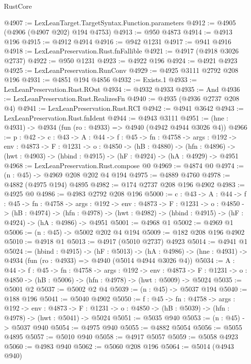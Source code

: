 \begin{lexlean}{RustCore}
\begin{coremodule}
@4907 := LexLeanTarget.TargetSyntax.Function.parameters
@4912 := @4905 (@4906 (@4907 @202) @194 @4753)
@4913 := @950 @4873
@4914 := @4913 @196
@4915 := @4912 @4914
@4916 := @942 @1231
@4917 := @941 @4916
@4918 := LexLeanPreservation.Rust.fnFallible
@4921 := @4917 (@4918 @3026 @2737)
@4922 := @950 @1231
@4923 := @4922 @196
@4924 := @4921 @4923
@4925 := LexLeanPreservation.RunConv
@4929 := @4925 @3111 @2792 @208 @196
@4931 := @4851 @194 @4856
@4932 := Exists.{1}
@4933 := LexLeanPreservation.Rust.ROut
@4934 := @4932 @4933
@4935 := And
@4936 := LexLeanPreservation.Rust.RealizesFn
@4940 := @4935 (@4936 @2737 @208 @4)
@4941 := LexLeanPreservation.Rust.RCI
@4942 := @4941 @3642
@4943 := LexLeanPreservation.Rust.fnIdent
@4944 := @4943 @3111
@4951 := (hne : @4931) -> @4934 (fun (ro : @4933) => @4940 (@4942 @4944 @3026 @4))
@4966 := {p : @42} ->
  {c : @43} ->
  {A : @44} ->
  {f : @45} ->
  {fn : @4758} ->
  {args : @192} ->
  {env : @4873} ->
  {F : @1231} ->
  {o : @4850} ->
  (hB : @4880) ->
  (hfn : @4896) -> (hwt : @4903) -> (hbind : @4915) -> (hF : @4924) -> (hA : @4929) -> @4951
@4968 := LexLeanPreservation.Rust.compose @0
@4969 := @4874 @0
@4974 := (n : @45) -> @4969 @208 @202 @4 @194
@4975 := @4889 @4760
@4978 := @4882 (@4975 @194) @4895
@4982 := @174 @2737 @208 @196 @4902
@4983 := @4925 @0
@4986 := @4983 @2792 @208 @196
@5000 := {c : @43} ->
  {A : @44} ->
  {f : @45} ->
  {fn : @4758} ->
  {args : @192} ->
  {env : @4873} ->
  {F : @1231} ->
  {o : @4850} ->
  (hB : @4974) ->
  (hfn : @4978) -> (hwt : @4982) -> (hbind : @4915) -> (hF : @4924) -> (hA : @4986) -> @4951
@5001 := @4968 @1
@5002 := @4969 @1
@5006 := (n : @45) -> @5002 @202 @4 @194
@5009 := @182 @208 @196 @4902
@5010 := @4918 @1
@5013 := @4917 (@5010 @2737) @4923
@5014 := @4941 @1
@5024 := (hbind : @4915) ->
  (hF : @5013) ->
  (hA : @4986) -> (hne : @4931) -> @4934 (fun (ro : @4933) => @4940 (@5014 @4944 @3026 @4))
@5034 := {A : @44} ->
  {f : @45} ->
  {fn : @4758} ->
  {args : @192} ->
  {env : @4873} ->
  {F : @1231} -> {o : @4850} -> (hB : @5006) -> (hfn : @4978) -> (hwt : @5009) -> @5024
@5035 := @5001 @2
@5037 := @5002 @2 @4
@5039 := (n : @45) -> @5037 @194
@5040 := @188 @196
@5041 := @5040 @4902
@5050 := {f : @45} ->
  {fn : @4758} ->
  {args : @192} ->
  {env : @4873} ->
  {F : @1231} -> {o : @4850} -> (hB : @5039) -> (hfn : @4978) -> (hwt : @5041) -> @5024
@5051 := @5035 @940
@5053 := (n : @45) -> @5037 @940
@5054 := @4975 @940
@5055 := @4882 @5054
@5056 := @5055 @4895
@5057 := @5010 @940
@5058 := @4917 @5057
@5059 := @5058 @4923
@5060 := @4983 @940
@5062 := @5060 @208 @196
@5064 := @5014 (@4943 @940)

\end{coremodule}
\end{lexlean}
